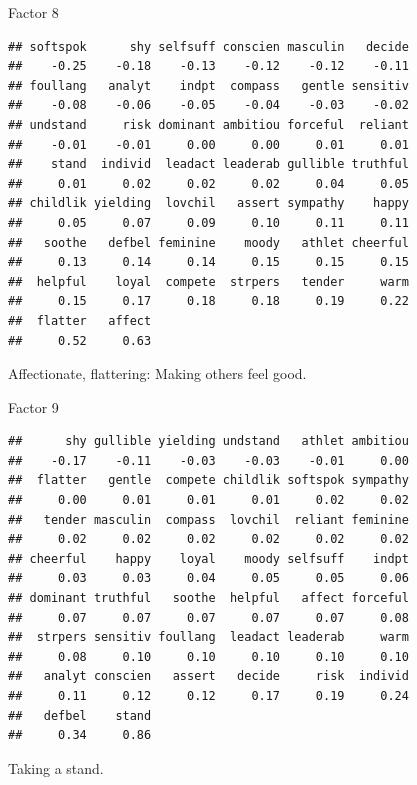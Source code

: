 \begin{frame}[fragile]{Factor 8}
  
  {\small
\begin{knitrout}
\color{fgcolor}\begin{kframe}
\begin{alltt}
\hlstd{mylist[[}\hlstd{]]}
\end{alltt}
\begin{verbatim}
## softspok      shy selfsuff conscien masculin   decide 
##    -0.25    -0.18    -0.13    -0.12    -0.12    -0.11 
## foullang   analyt    indpt  compass   gentle sensitiv 
##    -0.08    -0.06    -0.05    -0.04    -0.03    -0.02 
## undstand     risk dominant ambitiou forceful  reliant 
##    -0.01    -0.01     0.00     0.00     0.01     0.01 
##    stand  individ  leadact leaderab gullible truthful 
##     0.01     0.02     0.02     0.02     0.04     0.05 
## childlik yielding  lovchil   assert sympathy    happy 
##     0.05     0.07     0.09     0.10     0.11     0.11 
##   soothe   defbel feminine    moody   athlet cheerful 
##     0.13     0.14     0.14     0.15     0.15     0.15 
##  helpful    loyal  compete  strpers   tender     warm 
##     0.15     0.17     0.18     0.18     0.19     0.22 
##  flatter   affect 
##     0.52     0.63
\end{verbatim}
\end{kframe}
\end{knitrout}
}

Affectionate, flattering: Making others feel good.

\end{frame}
\begin{frame}[fragile]{Factor 9}
  
  {\small
\begin{knitrout}
\color{fgcolor}\begin{kframe}
\begin{alltt}
\hlstd{mylist[[}\hlstd{]]}
\end{alltt}
\begin{verbatim}
##      shy gullible yielding undstand   athlet ambitiou 
##    -0.17    -0.11    -0.03    -0.03    -0.01     0.00 
##  flatter   gentle  compete childlik softspok sympathy 
##     0.00     0.01     0.01     0.01     0.02     0.02 
##   tender masculin  compass  lovchil  reliant feminine 
##     0.02     0.02     0.02     0.02     0.02     0.02 
## cheerful    happy    loyal    moody selfsuff    indpt 
##     0.03     0.03     0.04     0.05     0.05     0.06 
## dominant truthful   soothe  helpful   affect forceful 
##     0.07     0.07     0.07     0.07     0.07     0.08 
##  strpers sensitiv foullang  leadact leaderab     warm 
##     0.08     0.10     0.10     0.10     0.10     0.10 
##   analyt conscien   assert   decide     risk  individ 
##     0.11     0.12     0.12     0.17     0.19     0.24 
##   defbel    stand 
##     0.34     0.86
\end{verbatim}
\end{kframe}
\end{knitrout}
}

Taking a stand.

\end{frame}
